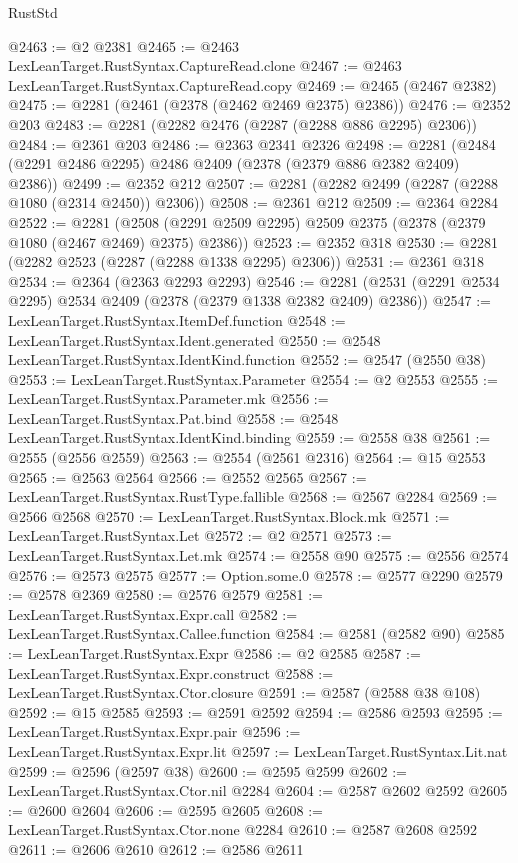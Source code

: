 \begin{lexlean}{RustStd}
\begin{coremodule}
@2463 := @2 @2381
@2465 := @2463 LexLeanTarget.RustSyntax.CaptureRead.clone
@2467 := @2463 LexLeanTarget.RustSyntax.CaptureRead.copy
@2469 := @2465 (@2467 @2382)
@2475 := @2281 (@2461 (@2378 (@2462 @2469 @2375) @2386))
@2476 := @2352 @203
@2483 := @2281 (@2282 @2476 (@2287 (@2288 @886 @2295) @2306))
@2484 := @2361 @203
@2486 := @2363 @2341 @2326
@2498 := @2281 (@2484 (@2291 @2486 @2295) @2486 @2409 (@2378 (@2379 @886 @2382 @2409) @2386))
@2499 := @2352 @212
@2507 := @2281 (@2282 @2499 (@2287 (@2288 @1080 (@2314 @2450)) @2306))
@2508 := @2361 @212
@2509 := @2364 @2284
@2522 := @2281
    (@2508 (@2291 @2509 @2295) @2509 @2375 (@2378 (@2379 @1080 (@2467 @2469) @2375) @2386))
@2523 := @2352 @318
@2530 := @2281 (@2282 @2523 (@2287 (@2288 @1338 @2295) @2306))
@2531 := @2361 @318
@2534 := @2364 (@2363 @2293 @2293)
@2546 := @2281 (@2531 (@2291 @2534 @2295) @2534 @2409 (@2378 (@2379 @1338 @2382 @2409) @2386))
@2547 := LexLeanTarget.RustSyntax.ItemDef.function
@2548 := LexLeanTarget.RustSyntax.Ident.generated
@2550 := @2548 LexLeanTarget.RustSyntax.IdentKind.function
@2552 := @2547 (@2550 @38)
@2553 := LexLeanTarget.RustSyntax.Parameter
@2554 := @2 @2553
@2555 := LexLeanTarget.RustSyntax.Parameter.mk
@2556 := LexLeanTarget.RustSyntax.Pat.bind
@2558 := @2548 LexLeanTarget.RustSyntax.IdentKind.binding
@2559 := @2558 @38
@2561 := @2555 (@2556 @2559)
@2563 := @2554 (@2561 @2316)
@2564 := @15 @2553
@2565 := @2563 @2564
@2566 := @2552 @2565
@2567 := LexLeanTarget.RustSyntax.RustType.fallible
@2568 := @2567 @2284
@2569 := @2566 @2568
@2570 := LexLeanTarget.RustSyntax.Block.mk
@2571 := LexLeanTarget.RustSyntax.Let
@2572 := @2 @2571
@2573 := LexLeanTarget.RustSyntax.Let.mk
@2574 := @2558 @90
@2575 := @2556 @2574
@2576 := @2573 @2575
@2577 := Option.some.{0}
@2578 := @2577 @2290
@2579 := @2578 @2369
@2580 := @2576 @2579
@2581 := LexLeanTarget.RustSyntax.Expr.call
@2582 := LexLeanTarget.RustSyntax.Callee.function
@2584 := @2581 (@2582 @90)
@2585 := LexLeanTarget.RustSyntax.Expr
@2586 := @2 @2585
@2587 := LexLeanTarget.RustSyntax.Expr.construct
@2588 := LexLeanTarget.RustSyntax.Ctor.closure
@2591 := @2587 (@2588 @38 @108)
@2592 := @15 @2585
@2593 := @2591 @2592
@2594 := @2586 @2593
@2595 := LexLeanTarget.RustSyntax.Expr.pair
@2596 := LexLeanTarget.RustSyntax.Expr.lit
@2597 := LexLeanTarget.RustSyntax.Lit.nat
@2599 := @2596 (@2597 @38)
@2600 := @2595 @2599
@2602 := LexLeanTarget.RustSyntax.Ctor.nil @2284
@2604 := @2587 @2602 @2592
@2605 := @2600 @2604
@2606 := @2595 @2605
@2608 := LexLeanTarget.RustSyntax.Ctor.none @2284
@2610 := @2587 @2608 @2592
@2611 := @2606 @2610
@2612 := @2586 @2611

\end{coremodule}
\end{lexlean}
